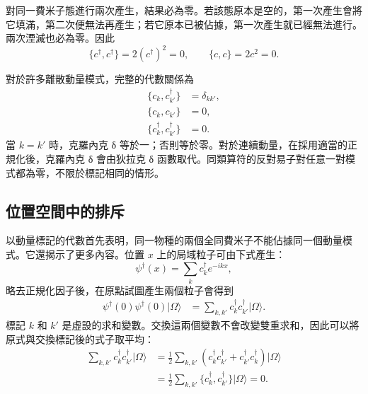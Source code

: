對同一費米子態進行兩次產生，結果必為零。若該態原本是空的，第一次產生會將它填滿，第二次便無法再產生；若它原本已被佔據，第一次產生就已經無法進行。兩次湮滅也必為零。因此
\begin{equation}
\{c^\dagger,c^\dagger\}=2(c^\dagger)^2=0,
\qquad
\{c,c\}=2c^2=0.
\end{equation}

\begin{classroomqa}
\end{classroomqa}

對於許多離散動量模式，完整的代數關係為
\begin{align}
\{c_k,c_{k'}^\dagger\}&=\delta_{kk'},
\\
\{c_k,c_{k'}\}&=0,
\\
\{c_k^\dagger,c_{k'}^\dagger\}&=0.
\end{align}
當 \(k=k'\) 時，克羅內克 {\proseunicodefont δ} 等於一；否則等於零。對於連續動量，在採用適當的正規化後，克羅內克 {\proseunicodefont δ} 會由狄拉克 {\proseunicodefont δ} 函數取代。同類算符的反對易子對任意一對模式都為零，不限於標記相同的情形。

\subsection{位置空間中的排斥}

以動量標記的代數首先表明，同一物種的兩個全同費米子不能佔據同一個動量模式。它還揭示了更多內容。位置 \(x\) 上的局域粒子可由下式產生：
\begin{equation}
\psi^\dagger(x)=\sum_k c_k^\dagger e^{-ikx},
\end{equation}
略去正規化因子後，在原點試圖產生兩個粒子會得到
\begin{align}
\psi^\dagger(0)\psi^\dagger(0)|\Omega\rangle
&=\sum_{k,k'}c_k^\dagger c_{k'}^\dagger|\Omega\rangle.
\end{align}
標記 \(k\) 和 \(k'\) 是虛設的求和變數。交換這兩個變數不會改變雙重求和，因此可以將原式與交換標記後的式子取平均：
\begin{align}
\sum_{k,k'}c_k^\dagger c_{k'}^\dagger|\Omega\rangle
&=\frac12\sum_{k,k'}
\left(c_k^\dagger c_{k'}^\dagger
+c_{k'}^\dagger c_k^\dagger\right)|\Omega\rangle
\\
&=\frac12\sum_{k,k'}
\{c_k^\dagger,c_{k'}^\dagger\}|\Omega\rangle
=0.
\end{align}

